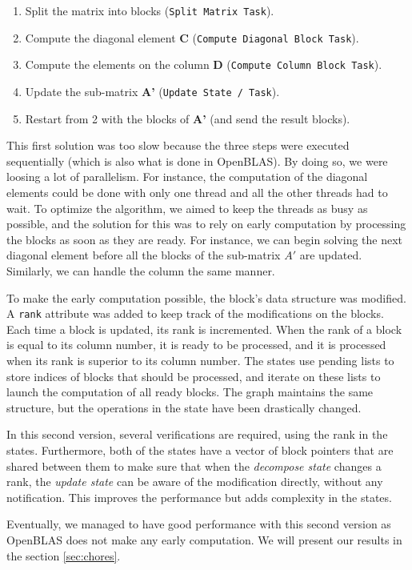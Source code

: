 \begin{enumerate}
  \item Split the matrix into blocks (\texttt{Split Matrix Task}).
  \item Compute the diagonal element \textbf{C} (\texttt{Compute Diagonal Block Task}).
  \item Compute the elements on the column \textbf{D} (\texttt{Compute Column Block Task}).
  \item Update the sub-matrix \textbf{A'} (\texttt{Update State / Task}).
  \item Restart from 2 with the blocks of \textbf{A'} (and send the result
    blocks).
\end{enumerate}

This first solution was too slow because the three steps were executed
sequentially (which is also what is done in OpenBLAS). By doing so, we were
loosing a lot of parallelism. For instance, the computation of the diagonal
elements could be done with only one thread and all the other threads had to
wait. To optimize the algorithm, we aimed to keep the threads as busy as
possible, and the solution for this was to rely on early computation by
processing the blocks as soon as they are ready. For instance, we can begin
solving the next diagonal element before all the blocks of the sub-matrix $A'$
are updated. Similarly, we can handle the column the same manner.

To make the early computation possible, the block's data structure was modified.
A \texttt{rank} attribute was added to keep track of the modifications on
the blocks. Each time a block is updated, its rank is incremented. When the rank
of a block is equal to its column number, it is ready to be processed, and it is
processed when its rank is superior to its column number. The states use pending
lists to store indices of blocks that should be processed, and iterate on these
lists to launch the computation of all ready blocks. The graph maintains the
same structure, but the operations in the state have been drastically changed.

In this second version, several verifications are required, using the rank
in the states. Furthermore, both of the states have a vector of block pointers
that are shared between them to make sure that when the \textit{decompose state}
changes a rank, the \textit{update state} can be aware of the modification
directly, without any notification. This improves the performance but adds
complexity in the states.

Eventually, we managed to have good performance with this second version as
OpenBLAS does not make any early computation. We will present our results in the
section \ref{sec:chores}.

